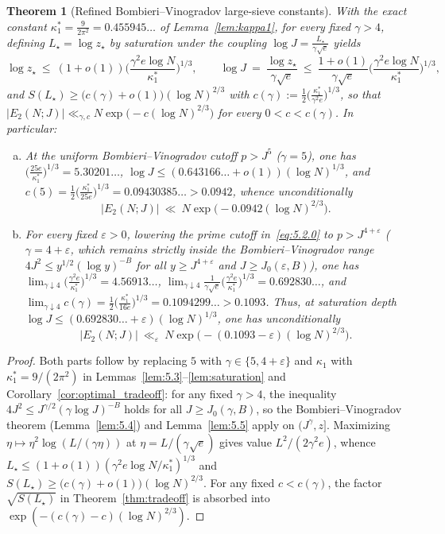 \documentclass[11pt, a4paper]{article}
\theoremstyle{plain}
\newtheorem{theorem}{Theorem}[section]
\theoremstyle{definition}
\begin{document}
\begin{theorem}[Refined Bombieri--Vinogradov large-sieve constants]\label{thm:improved_constants_and_effectivity}
With the exact constant $\kappa_1^{\ast}=\frac{9}{2\pi^{2}}=0.455945\ldots$ of Lemma~\ref{lem:kappa1}, for every fixed $\gamma>4$, defining $L_\star=\log z_\star$ by saturation under the coupling $\log J=\frac{L_\star}{\gamma\sqrt{e}}$ yields
$$\log z_\star\ \le\ (1+o(1))\Big(\frac{\gamma^{2}e\log N}{\kappa_1^{\ast}}\Big)^{1/3},\qquad \log J\ =\ \frac{\log z_\star}{\gamma\sqrt{e}}\ \le\ \frac{1+o(1)}{\gamma\sqrt{e}}\Big(\frac{\gamma^{2}e\log N}{\kappa_1^{\ast}}\Big)^{1/3},$$
and $S(L_\star)\ge\big(c(\gamma)+o(1)\big)(\log N)^{2/3}$ with $c(\gamma):=\frac12\big(\frac{\kappa_1^{\ast}}{\gamma^{2}e}\big)^{1/3}$, so that $|E_2(N;J)|\ll_{\gamma,c}N\exp\big(-c(\log N)^{2/3}\big)$ for every $0<c<c(\gamma)$. In particular:
\begin{enumerate}[(a)]
    \item At the uniform Bombieri--Vinogradov cutoff $p>J^{5}$ ($\gamma=5$), one has $\big(\frac{25e}{\kappa_1^{\ast}}\big)^{1/3}=5.30201\ldots$, $\log J\le(0.643166\ldots+o(1))(\log N)^{1/3}$, and $c(5)=\frac12\big(\frac{\kappa_1^{\ast}}{25e}\big)^{1/3}=0.09430385\ldots>0.0942$, whence unconditionally
    $$|E_2(N;J)|\ \ll\ N\exp\big(-0.0942(\log N)^{2/3}\big).$$
    \item For every fixed $\varepsilon>0$, lowering the prime cutoff in~\eqref{eq:5.2.0} to $p>J^{4+\varepsilon}$ ($\gamma=4+\varepsilon$, which remains strictly inside the Bombieri--Vinogradov range $4J^{2}\le y^{1/2}(\log y)^{-B}$ for all $y\ge J^{4+\varepsilon}$ and $J\ge J_0(\varepsilon,B)$), one has $\lim_{\gamma\downarrow 4}\big(\frac{\gamma^{2}e}{\kappa_1^{\ast}}\big)^{1/3}=4.56913\ldots$, $\lim_{\gamma\downarrow 4}\frac{1}{\gamma\sqrt{e}}\big(\frac{\gamma^{2}e}{\kappa_1^{\ast}}\big)^{1/3}=0.692830\ldots$, and $\lim_{\gamma\downarrow 4}c(\gamma)=\frac12\big(\frac{\kappa_1^{\ast}}{16e}\big)^{1/3}=0.1094299\ldots>0.1093$. Thus, at saturation depth $\log J\le(0.692830\ldots+\varepsilon)(\log N)^{1/3}$, one has unconditionally
    $$|E_2(N;J)|\ \ll_\varepsilon\ N\exp\big(-(0.1093-\varepsilon)(\log N)^{2/3}\big).$$
\end{enumerate}
\end{theorem}
\begin{proof}
Both parts follow by replacing $5$ with $\gamma\in\{5,4+\varepsilon\}$ and $\kappa_1$ with $\kappa_1^{\ast}=9/(2\pi^{2})$ in Lemmas~\ref{lem:5.3}--\ref{lem:saturation} and Corollary~\ref{cor:optimal_tradeoff}: for any fixed $\gamma>4$, the inequality $4J^{2}\le J^{\gamma/2}(\gamma\log J)^{-B}$ holds for all $J\ge J_0(\gamma,B)$, so the Bombieri--Vinogradov theorem (Lemma~\ref{lem:5.4}) and Lemma~\ref{lem:5.5} apply on $(J^{\gamma},z]$. Maximizing $\eta\mapsto\eta^{2}\log(L/(\gamma\eta))$ at $\eta=L/(\gamma\sqrt{e})$ gives value $L^{2}/(2\gamma^{2}e)$, whence $L_\star\le(1+o(1))(\gamma^{2}e\log N/\kappa_1^{\ast})^{1/3}$ and $S(L_\star)\ge\big(c(\gamma)+o(1)\big)(\log N)^{2/3}$. For any fixed $c<c(\gamma)$, the factor $\sqrt{S(L_\star)}$ in Theorem~\ref{thm:tradeoff} is absorbed into $\exp(-(c(\gamma)-c)(\log N)^{2/3})$.
\end{proof}
\end{document}
